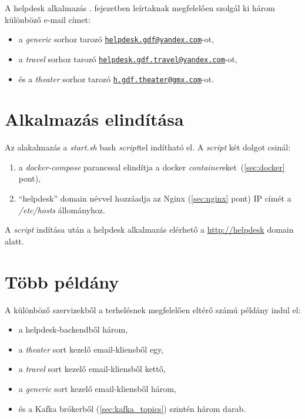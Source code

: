 A helpdesk alkalmazás . fejezetben leírtaknak megfelelően szolgál ki három különböző e-mail címet:

\begin{itemize}
	\item a \textit{generic} sorhoz tarozó  \href{mailto:helpdesk.gdf@yandex.com}{\nolinkurl{helpdesk.gdf@yandex.com}}-ot, 
	\item a \textit{travel} sorhoz tarozó  \href{mailto:helpdesk.gdf.travel@yandex.com}{\nolinkurl{helpdesk.gdf.travel@yandex.com}}-ot,
	\item és a \textit{theater} sorhoz tarozó  \href{mailto:h.gdf.theater@gmx.com}{\nolinkurl{h.gdf.theater@gmx.com}}-ot.
\end{itemize}



\section{Alkalmazás elindítása}\label{sec:elinditas}
Az alakalmazás a \textit{start.sh} bash \textit{script}tel indítható el. A \textit{script} két dolgot csinál:
\begin{enumerate}
	\item a \textit{docker-compose} parancssal elindítja a docker \textit{container}eket~(\ref{sec:docker} pont),
	\item  ``helpdesk'' domain névvel hozzáadja az Nginx (\ref{sec:nginx} pont) IP címét a \mbox{\textit{/etc/hosts}} állományhoz.
\end{enumerate}

A \textit{script} indítása után a helpdesk alkalmazás elérhető a  \href{http://helpdesk}{http://helpdesk} domain alatt.


\section{Több példány}
A különböző szervizekből a terhelésnek megfelelően eltérő számú példány indul el:

\begin{itemize}
	\item a helpdesk-backendből három,
	\item a \textit{theater} sort kezelő email-kliensből egy,
	\item a \textit{travel} sort kezelő email-kliensből kettő,
	\item a \textit{generic} sort kezelő email-kliensből három,
	\item és a Kafka brókerből (\ref{sec:kafka_topics}) szintén három darab.
\end{itemize}

